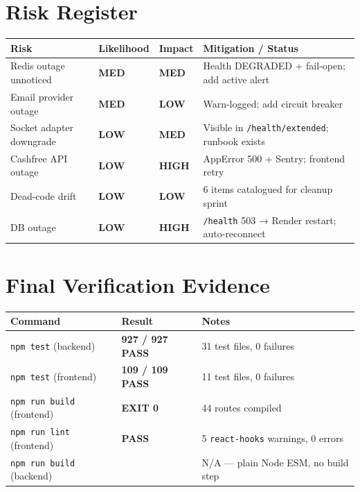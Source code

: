 \documentclass[11pt,a4paper]{article}
\newcommand{\cellok}[1]{\cellcolor{ok!15}\textbf{\color{ok}#1}}
\newcommand{\cellwarn}[1]{\cellcolor{warn!20}\textbf{\color{warn}#1}}
\newcommand{\cellcrit}[1]{\cellcolor{crit!15}\textbf{\color{crit}#1}}
\newcommand{\cellinfo}[1]{\cellcolor{info!10}\textbf{\color{info}#1}}
\newcommand{\na}{\textcolor{muted}{\textemdash}}
\newcommand{\th}[1]{\textbf{\color{white}#1}}
\begin{document}
\newpage

\section{Risk Register}

\begin{center}\footnotesize
\begin{longtable}{p{4cm}p{1.6cm}p{1.6cm}p{4.8cm}}
\toprule
\rowcolor{headbg}\th{Risk} & \th{Likelihood} & \th{Impact} & \th{Mitigation / Status} \\
\midrule
\endhead
Redis outage unnoticed & \cellinfo{MED} & \cellwarn{MED} & Health DEGRADED + fail-open; add active alert \\
\rowcolor{rowalt}Email provider outage & \cellinfo{MED} & \cellinfo{LOW} & Warn-logged; add circuit breaker \\
Socket adapter downgrade & \cellinfo{LOW} & \cellwarn{MED} & Visible in \texttt{/health/extended}; runbook exists \\
\rowcolor{rowalt}Cashfree API outage & \cellinfo{LOW} & \cellwarn{HIGH} & AppError 500 + Sentry; frontend retry \\
Dead-code drift & \cellinfo{LOW} & \cellinfo{LOW} & 6 items catalogued for cleanup sprint \\
\rowcolor{rowalt}DB outage & \cellinfo{LOW} & \cellcrit{HIGH} & \texttt{/health} 503 → Render restart; auto-reconnect \\
\bottomrule
\end{longtable}
\end{center}

\section{Final Verification Evidence}

\begin{center}\footnotesize
\begin{tabular}{p{5cm}p{3.5cm}p{4cm}}
\toprule
\rowcolor{headbg}\th{Command} & \th{Result} & \th{Notes} \\
\midrule
\texttt{npm test} (backend) & \cellok{927 / 927 PASS} & 31 test files, 0 failures \\
\rowcolor{rowalt}\texttt{npm test} (frontend) & \cellok{109 / 109 PASS} & 11 test files, 0 failures \\
\texttt{npm run build} (frontend) & \cellok{EXIT 0} & 44 routes compiled \\
\texttt{npm run lint} (frontend) & \cellok{PASS} & 5 \texttt{react-hooks} warnings, 0 errors \\
\texttt{npm run build} (backend) & \na & N/A — plain Node ESM, no build step \\
\bottomrule
\end{tabular}
\end{center}
\end{document}
